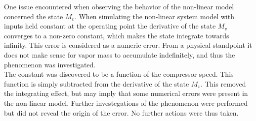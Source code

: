 One issue encountered when observing the behavior of the non-linear model concerned the state $M_v$. When simulating the non-linear system model with inputs held constant at the operating point the derivative of the state $M_v$ converges to a non-zero constant, which makes the state integrate towards infinity. This error is considered as a numeric error. From a physical standpoint it does not make sense for vapor mass to accumulate indefinitely, and thus the phenomenon was investigated. \\

The constant was discovered to be a function of the compressor speed. This function is simply subtracted from the derivative of the state $M_v$. This removed the integrating effect, but may imply that some numerical errors were present in the non-linear model. Further investegations of the phenomenon were performed but did not reveal the origin of the error. No further actions were thus taken.




